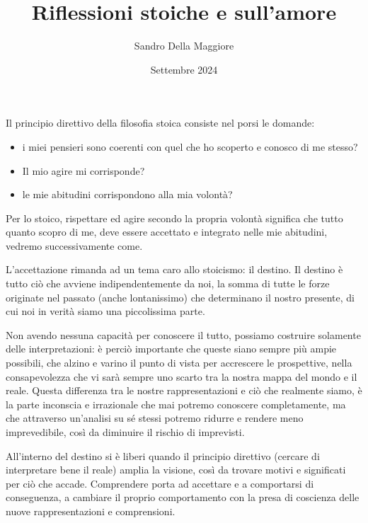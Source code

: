 \documentclass[a4paper,12pt,oneside]{article}%
\begin{document}
	\author{Sandro Della Maggiore}
	\title{Riflessioni stoiche e sull'amore}
	\date{Settembre 2024}
	
	\maketitle


Il principio direttivo della filosofia stoica consiste nel porsi le domande:

\begin{itemize}
	\item i miei pensieri sono coerenti con quel che ho scoperto e conosco di me stesso?
	\item Il mio agire mi corrisponde?
	\item le mie abitudini corrispondono alla mia volontà?
\end{itemize}

Per lo stoico, rispettare ed agire secondo la propria volontà significa che tutto quanto scopro di me, deve essere accettato e integrato nelle mie abitudini, vedremo successivamente come.

L'accettazione rimanda ad un tema caro allo stoicismo: il destino. Il destino è tutto ciò che avviene indipendentemente da noi, la somma di tutte le forze originate nel passato (anche lontanissimo) che determinano il nostro presente, di cui noi in verità siamo una piccolissima parte.

Non avendo nessuna capacità per conoscere il tutto, possiamo costruire solamente delle interpretazioni: è perciò importante che queste siano sempre più ampie possibili, che alzino e varino il punto di vista per accrescere le prospettive, nella consapevolezza che vi sarà sempre uno scarto tra la nostra mappa del mondo e il reale. Questa differenza tra le nostre rappresentazioni e ciò che realmente siamo, è la parte inconscia e irrazionale che mai potremo conoscere completamente, ma che attraverso un'analisi su sé stessi potremo ridurre e rendere meno imprevedibile, così da diminuire il rischio di imprevisti.

All'interno del destino si è liberi quando il principio direttivo (cercare di interpretare bene il reale) amplia la visione, così da trovare motivi e significati per ciò che accade. Comprendere porta ad accettare e a comportarsi di conseguenza, a cambiare il proprio comportamento con la presa di coscienza delle nuove rappresentazioni e comprensioni.
\end{document}
